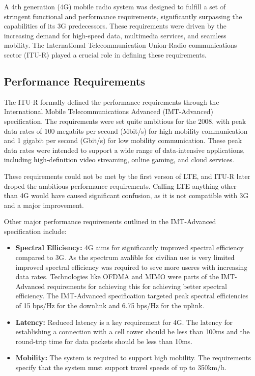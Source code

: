 A 4th generation (4G) mobile radio system was designed to fulfill a set of stringent functional and performance requirements, significantly surpassing the capabilities of its 3G predecessors. These requirements were driven by the increasing demand for high-speed data, multimedia services, and seamless mobility. The International Telecommunication Union-Radio communications sector (ITU-R) played a crucial role in defining these requirements.

\subsection{Performance Requirements}

The ITU-R formally defined the performance requirements through the International Mobile Telecommunications Advanced (IMT-Advanced) specification. The requirements were set quite ambitious for the 2008, with peak data rates of 100 megabits per second (Mbit/s) for high mobility communication and 1 gigabit per second (Gbit/s) for low mobility communication. These peak data rates were intended to support a wide range of data-intensive applications, including high-definition video streaming, online gaming, and cloud services.

These requirements could not be met by the first verson of LTE, and ITU-R later droped the ambitious performance requirements. Calling LTE anything other than 4G would have caused significant confusion, as it is not compatible with 3G and a major improvement.

Other major performance requirements outlined in the IMT-Advanced specification include:

\begin{itemize}
    \item \textbf{Spectral Efficiency:} 4G aims for significantly improved spectral efficiency compared to 3G. As the spectrum avalible for civilian use is very limited improved spectral efficiency was required to seve more useres with increasing data rates. Technologies like OFDMA and MIMO were parts of the IMT-Advanced requirements for achieving this for achieving better spectral efficiency. The IMT-Advanced specification targeted peak spectral efficiencies of 15 bps/Hz for the downlink and 6.75 bps/Hz for the uplink.
    \item \textbf{Latency:} Reduced latency is a key requirement for 4G. The latency for establishing a connection with a cell tower should be less than 100ms and the round-trip time for data packets should be less than 10ms.
    \item \textbf{Mobility:} The system is required to support high mobility. The requirements specify that the system must support travel speeds of up to 350km/h.
\end{itemize}

